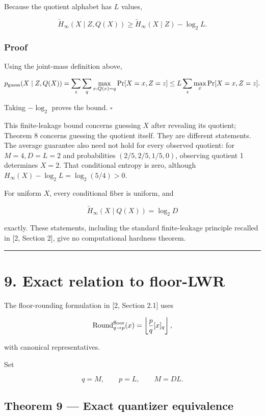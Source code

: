 \documentclass[11pt,a4paper]{article}
\begin{document}
Because the quotient alphabet has \(L\) values,

\[
\boxed{\widetilde H_\infty(X\mid Z,Q(X))
\ge\widetilde H_\infty(X\mid Z)-\log_2L.}
\]

\subsubsection{Proof}\label{proof-8}

Using the joint-mass definition above,

\[
p_{\rm guess}(X\mid Z,Q(X))
=\sum_z\sum_q\max_{x:Q(x)=q}\Pr[X=x,Z=z]
\le L\sum_z\max_x\Pr[X=x,Z=z].
\]

Taking \(-\log_2\) proves the bound. \(\square\)

This finite-leakage bound concerns guessing \(X\) after revealing its quotient; Theorem 8 concerns guessing the quotient itself. They are different statements. The average guarantee also need not hold for every observed quotient: for \(M=4,D=L=2\) and probabilities \((2/5,2/5,1/5,0)\), observing quotient 1 determines \(X=2\). That conditional entropy is zero, although \(H_\infty(X)-\log_2L=\log_2(5/4)>0\).

For uniform \(X\), every conditional fiber is uniform, and

\[
\widetilde H_\infty(X\mid Q(X))=\log_2D
\]

exactly. These statements, including the standard finite-leakage principle recalled in {[}2, Section 2{]}, give no computational hardness theorem.

\begin{center}\rule{0.5\linewidth}{0.5pt}\end{center}

\section{9. Exact relation to floor-LWR}\label{exact-relation-to-floor-lwr}

The floor-rounding formulation in {[}2, Section 2.1{]} uses

\[
\operatorname{Round}^{\rm floor}_{q\to p}(x)
=
\left\lfloor
\frac{p}{q}[x]_q
\right\rfloor,
\]

with canonical representatives.

Set

\[
q=M,\qquad p=L,\qquad M=DL.
\]

\subsection{Theorem 9 --- Exact quantizer equivalence}\label{theorem-9-exact-quantizer-equivalence}
\end{document}
